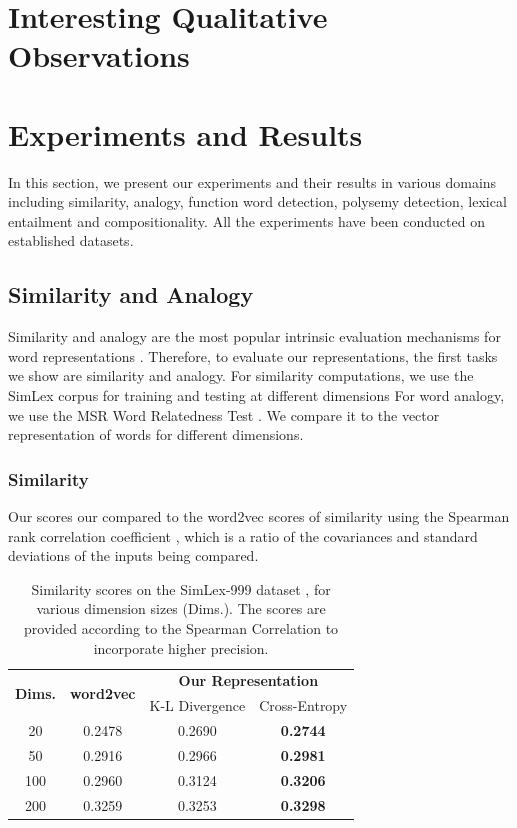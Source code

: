 \documentclass[11pt]{book}
\newcommand{\citep}[1]{\cite{#1}}
\begin{document}
\section{Interesting Qualitative Observations}
\label{sec: observations}

\section{Experiments and Results}
\label{sec: results}

In this section, we present our experiments and their results in various
domains including similarity, analogy, function word detection, polysemy
detection, lexical entailment and compositionality. All the experiments have
been conducted on established datasets.

\subsection{Similarity and Analogy}
\label{ssec: sim-anal}

Similarity and analogy are the most popular intrinsic evaluation mechanisms for
word representations \citep{mikolov2013efficient}. Therefore, to evaluate our
representations, the first tasks we show are similarity and analogy. For
similarity computations, we use the SimLex corpus \citep{hill2015simlex} for
training and testing at different dimensions For word analogy, we use the MSR
Word Relatedness Test \citep{mikolov2013linguistic}. We compare it to the
vector representation of words for different dimensions.

\subsubsection{Similarity}

Our scores our compared to the word2vec scores of similarity using the Spearman
rank correlation coefficient \citep{spearman1987proof}, which is a ratio of the
covariances and standard deviations of the inputs being compared.

\begin{table}[]
    \centering
    \begin{tabular}{c|c|cc}
        \multirow{2}{*}{\bf Dims.}   & \multirow{2}{*}{\bf word2vec} & \multicolumn{2}{c}{\bf Our Representation} \\ \cline{3-4}
                            &                               & K-L Divergence & Cross-Entropy \\\hline
        20  &   0.2478   & 0.2690 & \bf 0.2744    \\
        50  &   0.2916   & 0.2966 & \bf 0.2981    \\
        100 &   0.2960   & 0.3124 & \bf 0.3206    \\
        200 &   0.3259   & 0.3253 & \bf 0.3298
    \end{tabular}
    \caption{Similarity scores on the SimLex-999 dataset \citep{hill2015simlex}, for various dimension sizes (Dims.). The scores are provided according to the Spearman Correlation to incorporate higher precision.}
    \label{tab: similarity scores}
\end{table}
\end{document}
